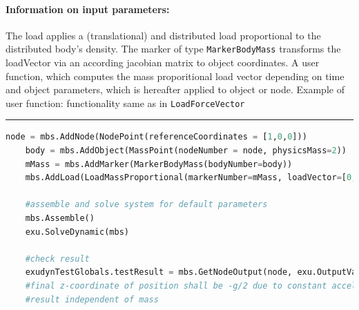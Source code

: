 \paragraph{Information on input parameters:} 
\finishTable
 \noindent
    The load applies a (translational) and distributed load proportional to the distributed body's density.
    The marker of type \texttt{MarkerBodyMass} transforms the loadVector via an according jacobian matrix to object coordinates.
    A user function, which computes the mass proporitional load vector depending on time and object parameters, which is hereafter applied to object or node.
    \finishTable
    Example of user function: functionality same as in \texttt{LoadForceVector}
\vspace{6pt}\par\noindent\rule{\textwidth}{0.4pt}
\label{miniExample_LoadMassProportional}
\pythonstyle
\begin{lstlisting}[language=Python, firstnumber=1]
    node = mbs.AddNode(NodePoint(referenceCoordinates = [1,0,0]))
    body = mbs.AddObject(MassPoint(nodeNumber = node, physicsMass=2))
    mMass = mbs.AddMarker(MarkerBodyMass(bodyNumber=body))
    mbs.AddLoad(LoadMassProportional(markerNumber=mMass, loadVector=[0,0,-9.81]))

    #assemble and solve system for default parameters
    mbs.Assemble()
    exu.SolveDynamic(mbs)

    #check result
    exudynTestGlobals.testResult = mbs.GetNodeOutput(node, exu.OutputVariableType.Position)[2]
    #final z-coordinate of position shall be -g/2 due to constant acceleration with g=-9.81
    #result independent of mass
\end{lstlisting}

